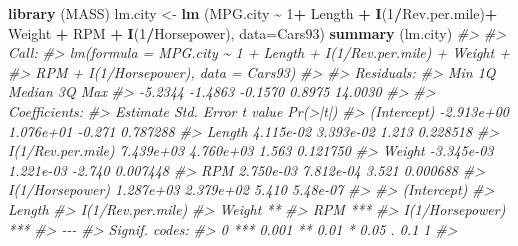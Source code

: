 \documentclass[
]{book}
\newenvironment{Shaded}{\begin{snugshade}}{\end{snugshade}}
\newcommand{\AttributeTok}[1]{\textcolor[rgb]{0.13,0.29,0.53}{#1}}
\newcommand{\CommentTok}[1]{\textcolor[rgb]{0.56,0.35,0.01}{\textit{#1}}}
\newcommand{\DecValTok}[1]{\textcolor[rgb]{0.00,0.00,0.81}{#1}}
\newcommand{\FunctionTok}[1]{\textcolor[rgb]{0.13,0.29,0.53}{\textbf{#1}}}
\newcommand{\NormalTok}[1]{#1}
\newcommand{\OtherTok}[1]{\textcolor[rgb]{0.56,0.35,0.01}{#1}}
\newcommand{\SpecialCharTok}[1]{\textcolor[rgb]{0.81,0.36,0.00}{\textbf{#1}}}
\begin{document}
\begin{Shaded}
\begin{Highlighting}[]
\FunctionTok{library}\NormalTok{ (MASS)}
\NormalTok{lm.city }\OtherTok{\textless{}{-}} \FunctionTok{lm}\NormalTok{ (MPG.city }\SpecialCharTok{\textasciitilde{}} \DecValTok{1}\SpecialCharTok{+}\NormalTok{ Length }\SpecialCharTok{+} \FunctionTok{I}\NormalTok{(}\DecValTok{1}\SpecialCharTok{/}\NormalTok{Rev.per.mile)}\SpecialCharTok{+}\NormalTok{ Weight }\SpecialCharTok{+}\NormalTok{ RPM }\SpecialCharTok{+}
                 \FunctionTok{I}\NormalTok{(}\DecValTok{1}\SpecialCharTok{/}\NormalTok{Horsepower), }\AttributeTok{data=}\NormalTok{Cars93)}
\FunctionTok{summary}\NormalTok{ (lm.city)}
\CommentTok{\#\textgreater{} }
\CommentTok{\#\textgreater{} Call:}
\CommentTok{\#\textgreater{} lm(formula = MPG.city \textasciitilde{} 1 + Length + I(1/Rev.per.mile) + Weight + }
\CommentTok{\#\textgreater{}     RPM + I(1/Horsepower), data = Cars93)}
\CommentTok{\#\textgreater{} }
\CommentTok{\#\textgreater{} Residuals:}
\CommentTok{\#\textgreater{}     Min      1Q  Median      3Q     Max }
\CommentTok{\#\textgreater{} {-}5.2344 {-}1.4863 {-}0.1570  0.8975 14.0030 }
\CommentTok{\#\textgreater{} }
\CommentTok{\#\textgreater{} Coefficients:}
\CommentTok{\#\textgreater{}                     Estimate Std. Error t value Pr(\textgreater{}|t|)}
\CommentTok{\#\textgreater{} (Intercept)       {-}2.913e+00  1.076e+01  {-}0.271 0.787288}
\CommentTok{\#\textgreater{} Length             4.115e{-}02  3.393e{-}02   1.213 0.228518}
\CommentTok{\#\textgreater{} I(1/Rev.per.mile)  7.439e+03  4.760e+03   1.563 0.121750}
\CommentTok{\#\textgreater{} Weight            {-}3.345e{-}03  1.221e{-}03  {-}2.740 0.007448}
\CommentTok{\#\textgreater{} RPM                2.750e{-}03  7.812e{-}04   3.521 0.000688}
\CommentTok{\#\textgreater{} I(1/Horsepower)    1.287e+03  2.379e+02   5.410 5.48e{-}07}
\CommentTok{\#\textgreater{}                      }
\CommentTok{\#\textgreater{} (Intercept)          }
\CommentTok{\#\textgreater{} Length               }
\CommentTok{\#\textgreater{} I(1/Rev.per.mile)    }
\CommentTok{\#\textgreater{} Weight            ** }
\CommentTok{\#\textgreater{} RPM               ***}
\CommentTok{\#\textgreater{} I(1/Horsepower)   ***}
\CommentTok{\#\textgreater{} {-}{-}{-}}
\CommentTok{\#\textgreater{} Signif. codes:  }
\CommentTok{\#\textgreater{} 0 \textquotesingle{}***\textquotesingle{} 0.001 \textquotesingle{}**\textquotesingle{} 0.01 \textquotesingle{}*\textquotesingle{} 0.05 \textquotesingle{}.\textquotesingle{} 0.1 \textquotesingle{} \textquotesingle{} 1}
\CommentTok{\#\textgreater{} }

\end{Highlighting}
\end{Shaded}
\end{document}
